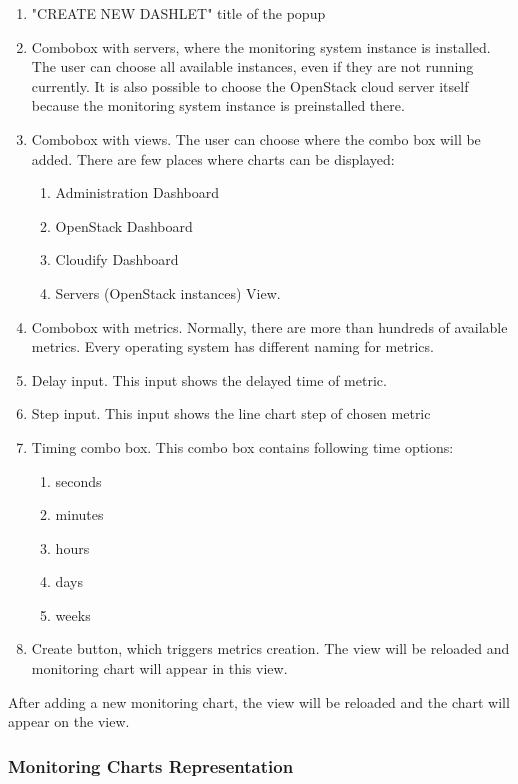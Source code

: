 \begin{enumerate}
\item "CREATE NEW DASHLET" title of the popup
\item Combobox with servers, where the monitoring system instance is installed. The user can choose all available instances, even if they are not running currently. It is also possible to choose the OpenStack cloud server itself because the monitoring system instance is preinstalled there.
\item Combobox with views.  The user can choose where the combo box will be added. There are few places where charts can be displayed:
\begin{enumerate}
\item Administration Dashboard
\item OpenStack Dashboard
\item Cloudify Dashboard
\item Servers (OpenStack instances) View. 
\end{enumerate}
\item Combobox with metrics. Normally, there are more than hundreds of available metrics. Every operating system has different naming for metrics.
\item Delay input. This input shows the delayed time of metric.
\item Step input. This input shows the line chart step of chosen metric
\item Timing combo box. This combo box contains following time options:
\begin{enumerate}
\item seconds
\item minutes
\item hours
\item days
\item weeks
\end{enumerate}
\item Create button, which triggers metrics creation. The view will be reloaded and monitoring chart will appear in this view.
\end{enumerate}

After adding a new monitoring chart, the view will be reloaded and the chart will appear on the view. 

\subsubsection{Monitoring Charts Representation}\label{Monitoring chart representation}

